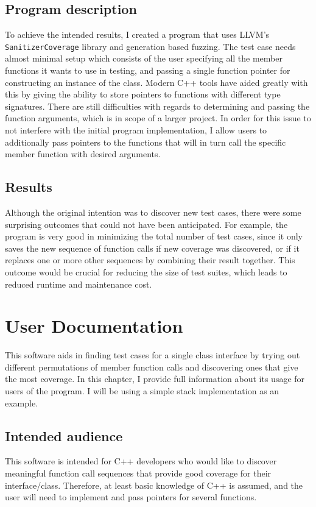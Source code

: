 \documentclass{elteikthesis}[2018/06/06]
\newcommand*{\code}{\lstinline[keywordstyle=\color{violet}, basicstyle=\color{violet}]}
\renewcommand{\footnote}{\endnote}
\begin{document}
\section{Program description}
\label{sec-1-3}
To achieve the intended results, I created a program that uses LLVM's \code{SanitizerCoverage} library and generation based fuzzing. The test case needs almost minimal setup which consists of the user specifying all the member functions it wants to use in testing, and passing a single function pointer for constructing an instance of the class. Modern C++ tools have aided greatly with this by giving the ability to store pointers to functions with different type signatures. There are still difficulties with regards to determining and passing the function arguments, which is in scope of a larger project. In order for this issue to not interfere with the initial program implementation, I allow users to additionally pass pointers to the functions that will in turn call the specific member function with desired arguments. \\

\section{Results}
\label{sec-1-4}
Although the original intention was to discover new test cases, there were some surprising outcomes that could not have been anticipated. For example, the program is very good in minimizing the total number of test cases, since it only saves the new sequence of function calls if new coverage was discovered, or if it replaces one or more other sequences by combining their result together. This outcome would be crucial for reducing the size of test suites, which leads to reduced runtime and maintenance cost. \\
\chapter{User Documentation}
\label{sec-2}
This software aids in finding test cases for a single class interface by trying out different permutations of member function calls and discovering ones that give the most coverage. In this chapter, I provide full information about its usage for users of the program. I will be using a simple stack implementation as an example\footnote{DEFINITION NOT FOUND.}. \\
\section{Intended audience}
\label{sec-2-1}
This software is intended for C++ developers who would like to discover meaningful function call sequences that provide good coverage for their interface/class. Therefore, at least basic knowledge of C++ is assumed, and the user will need to implement and pass pointers for several functions. \\
\end{document}
